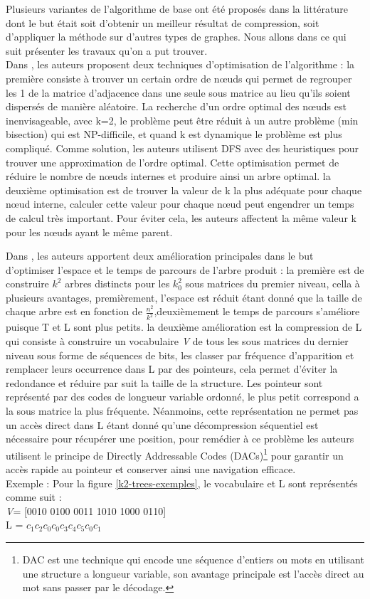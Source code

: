 Plusieurs variantes de l'algorithme de base ont été proposés dans la littérature dont le but était soit d'obtenir un meilleur résultat de compression, soit d'appliquer la méthode sur d'autres types de graphes. Nous allons dans ce qui suit présenter les travaux qu'on a put trouver.\\

Dans \citep{shi2012optimizing}, les auteurs proposent deux techniques d'optimisation de l'algorithme : la première consiste à trouver un certain ordre de nœuds qui permet de regrouper les 1 de la matrice d'adjacence dans une seule sous matrice au lieu qu'ils soient dispersés de manière aléatoire. La recherche d'un ordre optimal des nœuds est inenvisageable, avec k=2, le problème peut être réduit à un autre problème (min bisection) qui est NP-difficile, et quand k est dynamique le problème est plus compliqué. Comme solution, les auteurs utilisent DFS avec des heuristiques pour trouver une approximation de l'ordre optimal. Cette optimisation permet de réduire le nombre de nœuds internes et produire ainsi un arbre optimal. la deuxième optimisation est de trouver la valeur de k la plus adéquate pour chaque nœud interne, calculer cette valeur pour chaque nœud peut engendrer un temps de calcul très important. Pour éviter cela, les auteurs affectent la même valeur k pour les nœuds ayant le même parent. 	

Dans \citep{brisaboa2014compact}, les auteurs apportent deux amélioration principales dans le but d'optimiser l'espace et le temps de parcours de l'arbre produit : la première est de construire $k^2$ arbres distincts pour les $k_{0}^{2}$ sous matrices du premier niveau, cella à plusieurs avantages, premièrement, l'espace est réduit étant donné que la taille de chaque arbre est en fonction de $\frac{n^2}{k^2}$,deuxièmement le temps de parcours s'améliore puisque T et L sont plus petits. la deuxième amélioration est la compression de L qui consiste à construire un vocabulaire \textit{V} de tous les sous matrices du dernier niveau sous forme de séquences de bits, les classer par fréquence d'apparition et remplacer leurs occurrence dans L par des pointeurs, cela permet d'éviter la redondance et réduire par suit la taille de la structure. Les pointeur sont représenté par des codes de longueur variable ordonné, le plus petit correspond a la sous matrice la plus fréquente. Néanmoins, cette représentation ne permet  pas un accès direct dans L étant donné qu'une décompression séquentiel est nécessaire pour récupérer une position, pour remédier à ce problème les auteurs utilisent le principe de Directly Addressable Codes (DACs)\footnote{DAC est une technique qui encode une séquence d'entiers ou mots en utilisant une structure a longueur variable, son avantage principale est l'accès direct au mot sans passer par le décodage.} \citep{brisaboa2013dacs} pour garantir un accès rapide au pointeur et conserver ainsi une navigation efficace.\\
Exemple : Pour la figure \ref{k2-trees-exemples}, le vocabulaire et L sont représentés comme suit :\\
\textit{V}= [0010 0100 0011 1010 1000 0110]\\
L = $c_{1}c_{2}c_{0}c_{0}c_{3}c_{4}c_{5}c_{0}c_{1}$ \\

